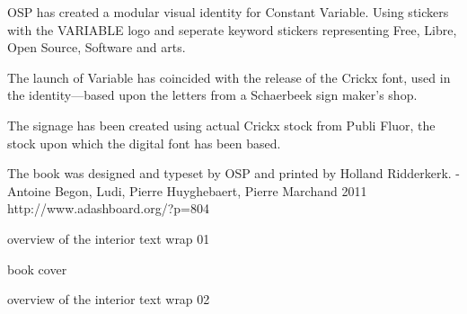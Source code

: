 OSP has created a modular visual identity for Constant Variable. Using
stickers with the VARIABLE logo and seperate keyword stickers
representing Free, Libre, Open Source, Software and arts.

The launch of Variable has coincided with the release of the Crickx
font, used in the identity---based upon the letters from a Schaerbeek
sign maker's shop.

The signage has been created using actual Crickx stock from Publi Fluor,
the stock upon which the digital font has been based.

{}
{}
{} {}




\subject{Tot Later}


The book was designed and typeset by OSP and printed by Holland
Ridderkerk. - Antoine Begon, Ludi, Pierre Huyghebaert, Pierre Marchand
2011 http://www.adashboard.org/?p=804


overview of the interior text wrap 01


book cover


overview of the interior text wrap 02




